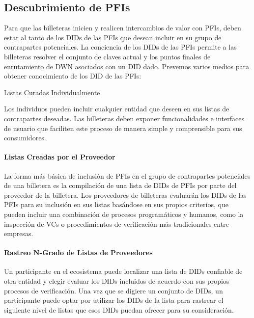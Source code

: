 \documentclass[11pt]{article}
\begin{document}
\vspace{1\baselineskip}
\subsection{Descubrimiento de PFIs}

\vspace{1\baselineskip}
Para que las billeteras inicien y realicen intercambios de valor con PFIs, deben estar al tanto de los DIDs de las PFIs que desean incluir en su grupo de contrapartes potenciales. La conciencia de los DIDs de las PFIs permite a las billeteras resolver el conjunto de claves actual y los puntos finales de enrutamiento de DWN asociados con un DID dado. Prevemos varios medios para obtener conocimiento de los DID de las PFIs:

\vspace{1\baselineskip}
{\Large \textcolor[HTML]{434343}{Listas Curadas Individualmente}}

Los individuos pueden incluir cualquier entidad que deseen en sus listas de contrapartes deseadas. Las billeteras deben exponer funcionalidades e interfaces de usuario que faciliten este proceso de manera simple y comprensible para sus consumidores.

\paragraph{Listas Creadas por el Proveedor}

La forma más básica de inclusión de PFIs en el grupo de contrapartes potenciales de una billetera es la compilación de una lista de DIDs de PFIs por parte del proveedor de la billetera. Los proveedores de billeteras evaluarán los DIDs de las PFIs para su inclusión en sus listas basándose en sus propios criterios, que pueden incluir una combinación de procesos programáticos y humanos, como la inspección de VCs o procedimientos de verificación más tradicionales entre empresas.

\paragraph{Rastreo N-Grado de Listas de Proveedores}

Un participante en el ecosistema puede localizar una lista de DIDs confiable de otra entidad y elegir evaluar los DIDs incluidos de acuerdo con sus propios procesos de verificación. Una vez que se digiere un conjunto de DIDs, un participante puede optar por utilizar los DIDs de la lista para rastrear el siguiente nivel de listas que esos DIDs puedan ofrecer para su consideración.
\end{document}
